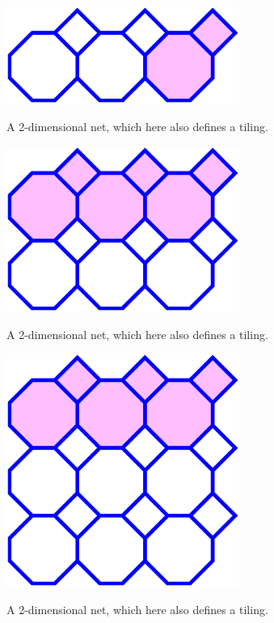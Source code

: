 \documentclass{beamer}
\begin{document}
\begin{frame}
  \begin{center}
    \includegraphics[width=3in]{periodic3}

    A 2-dimensional net, which here also defines a tiling.
  \end{center}
\end{frame}

\begin{frame}
  \begin{center}
    \includegraphics[width=3in]{periodic4}

    A 2-dimensional net, which here also defines a tiling.
  \end{center}
\end{frame}

\begin{frame}
  \begin{center}
    \includegraphics[width=3in]{periodic5}

    A 2-dimensional net, which here also defines a tiling.
  \end{center}
\end{frame}
\end{document}

